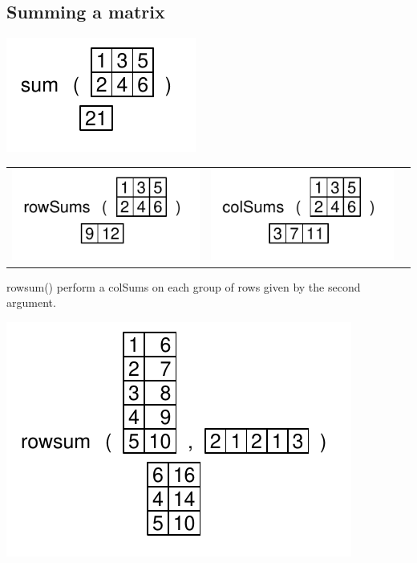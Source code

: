 \documentclass[pdflatex]{article}
\begin{document}
\subsection{Summing a matrix}

\includegraphics{matrix_sum} 

\begin{tabular}{ccc}
\includegraphics{rowSums} & \includegraphics{colSums}
\end{tabular}

rowsum() perform a colSums on each group of rows given by the second argument.

\includegraphics{rowsum} 
\end{document}
